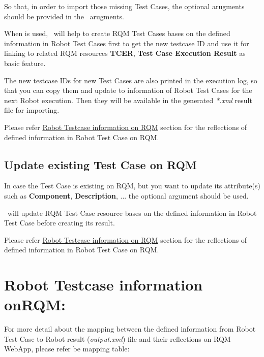 So that, in order to import those missing  Test Cases, the 
optional arugments  should be provided in the \pkg\
arugments.

When  is used, \pkg\ will help to create RQM Test Cases 
bases on the defined information in Robot Test Cases first to get the new 
testcase ID and use it for linking to related RQM resources \textbf{TCER}, 
\textbf{Test Case Execution Result} as basic feature.

The new testcase IDs for new Test Cases are also printed in the execution log,
so that you can copy them and update to \rcode{TCID-xxx} information of Robot 
Test Cases for the next Robot execution. Then they will be available in the 
generated \emph{*.xml} result file for importing. 

Please refer \hyperref[description-robot-testcase-information-on-rqm]
{Robot Testcase information on RQM} section for the reflections of defined 
information in Robot Test Case on RQM.

\subsection{Update existing Test Case on RQM}
In case the Test Case is existing on RQM, but you want to update its attribute(s)
such as \textbf{Component}, \textbf{Description}, ... the optional argument
\rlog{--updatetestcase} should be used.

\pkg\ will update RQM Test Case resource bases on the defined information in 
Robot Test Case before creating its result.

Please refer \hyperref[description-robot-testcase-information-on-rqm]{Robot Testcase information on RQM}
section for the reflections of defined information in Robot Test Case on RQM.

\hypertarget{description-robot-testcase-information-on-rqm}{%
\section{Robot Testcase information onRQM:}
\label{description-robot-testcase-information-on-rqm}}
For more detail about the mapping between the defined information from Robot 
Test Case to Robot result (\emph{output.xml}) file and their reflections on 
RQM WebApp, please refer be mapping table:

